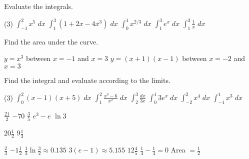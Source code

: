 \begin{Exercise}[title={Area},label=exArea]
	\Question Evaluate the integrals. 
	\begin{tasks}(3)
		\task  $\int _{ -1}^{2}x^{5}\; d x$ %
		\task $\int _{1}^{3}\left (1 +2 x -4 x^{3}\right )\; d x$ %
		\task $\int _{0}^{1}x^{2/3}\; d x$ %
		\task $\int _{1}^{3}e^{x}\; d x$ %
		\task $\int _{1}^{3}\frac{1}{x}\; d x$ %
	\end{tasks}
	
	\Question Find the area under the curve.
	\begin{tasks}
		\task $y =x^{3}$ between $x = -1$ and $x =3$ %
		\task $y =\left (x +1\right ) \left (x -1\right )$ between $x = -2$ and $x =3$ %
	\end{tasks}
	
	\Question Find the integral and evaluate according to the limits.
	\begin{tasks}(3)
		\task $\int _{0}^{2}\left (x -1\right ) \left (x +5\right )\; d x$ %
		\task $\int _{1}^{2}\frac{x^{3} -6}{x^{2}}\; d x$  %
		\task $\int _{2}^{3}\frac{d x}{3 x}$ %
		\task $\int _{0}^{1}3 e^{x}\; d x$ %
		\task $\int _{ -2}^{2}x^{4}\; d x$  %
		\task $\int _{ -1}^{1}x^{3}\; d x$ %
	\end{tasks}
\end{Exercise}
\begin{Answer}[ref={exArea}]
	\Question %
\begin{tasks}
	\task $\frac{21}{2}$
	\task $ -70$ 
	\task $\frac{3}{5}$
	\task $e^{3} -e$ 
	\task $\ln  3$ 
\end{tasks}

\Question %
\begin{tasks}
	\task $20\frac{1}{2}$
	\task $9\frac{1}{3}$
\end{tasks}

\Question %
\begin{tasks}
	\task $\frac{2}{3}$
	\task $ -1\frac{1}{2}$ 
	\task $\frac{1}{3} \ln  \frac{3}{2} \approx 0.135$
	\task $3 \left (e -1\right ) \approx 5.155$
	\task $12\frac{4}{5}$ 
	\task $\frac{1}{4} -\frac{1}{4} =0$ Area $ =\frac{1}{2}$
\end{tasks}
\end{Answer}%

